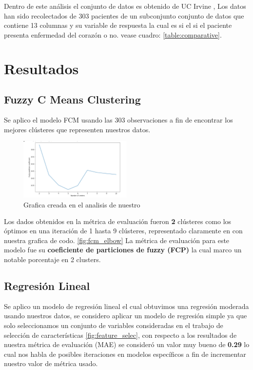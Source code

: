 \documentclass[10pt,journal]{IEEEtran}
\begin{document}
Dentro de este análisis el conjunto de datos es obtenido de UC Irvine \cite{UCI} , Los datos han sido recolectados de 303 pacientes de un subconjunto conjunto de datos que contiene 13 columnas y su variable de respuesta la cual es si el si el paciente presenta enfermedad del corazón o no. vease cuadro: \ref{table:comparative}.


\section{Resultados}

\subsection{Fuzzy C Means Clustering}
Se aplico el modelo FCM usando las 303 observaciones a fin de encontrar los mejores clústeres que representen nuestros datos.

\begin{figure}[ht]
    \centering
    \includegraphics[width=0.50\textwidth]{elbow_centers.png}
    \caption{ Grafica creada en el analisis de nuestro} 
    \label{fig:fcm_elbow}
\end{figure}

Los dados obtenidos en la métrica de evaluación fueron \textbf{2} clústeres como los óptimos en una iteración de 1 hasta 9 clústeres, representado claramente en con nuestra grafica de codo. \autoref{fig:fcm_elbow} La métrica de evaluación para este modelo fue su \textbf{coeficiente de particiones de fuzzy (FCP)} la cual marco un notable porcentaje en 2 clusters.


\subsection{Regresión Lineal}

Se aplico un modelo de regresión lineal el cual obtuvimos una regresión moderada usando nuestros datos, se considero aplicar un modelo de regresión simple ya que solo seleccionamos un conjunto de variables consideradas en el trabajo de selección de características \ref{fig:feature_selec}, con respecto a los resultados de  nuestra métrica de evaluación (MAE) se consideró  un valor muy bueno de  \textbf{0.29} lo cual nos habla de posibles iteraciones en modelos específicos a fin de incrementar nuestro valor de métrica usado.
\end{document}
